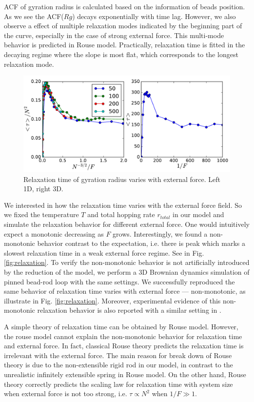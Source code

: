 \documentclass[aps,showpacs,twocolumn,floatfix,prx,superscriptaddress]{revtex4-1}
\begin{document}
ACF of gyration radius is calculated based on the information of beads position.
As we see the ACF($Rg$) decays exponentially with time
lag. However, we also observe a effect of multiple relaxation modes indicated
by the beginning part of the curve, especially in the case of strong external
force. This multi-mode behavior is predicted in Rouse model. 
Practically, relaxation time is fitted in the decaying regime where the slope
is most flat, which corresponds to the longest relaxation mode.   
\begin{figure}[htpb]
    \centering
    \includegraphics[width=1.0\linewidth]{tauscaling}
    \caption{Relaxation time of gyration radius varies with external force. Left
        1D, right 3D.}
    \label{fig:tauscaling}
\end{figure}
We interested in how the relaxation time varies with the external force field.
So we fixed the temperature $T$ and total hopping rate $r_{total}$ in our model and
simulate the relaxation behavior for different external force. One would
intuitively expect a monotonic decreasing as $F$ grows. Interestingly, we found a
non-monotonic behavior contrast to the expectation, i.e. there is peak which
marks a slowest relaxation time in a weak external force regime. See in Fig.
\ref{fig:relaxation}. To verify the non-monotonic behavior is not artificially
introduced by the reduction of the model, we perform a 3D Brownian dynamics
simulation of pinned bead-rod loop with the same settings. We successfully
reproduced the same behavior of relaxation time varies with external force ---
non-monotonic, as illustrate in Fig. \ref{fig:relaxation}. Moreover,
experimental evidence of this non-monotonic relaxation behavior is also
reported with a similar setting in \cite{Doyle2000}.

A simple theory of relaxation time can be obtained by Rouse
model\cite{Rouse1953,Doi1986}.
However, the rouse model cannot explain the non-monotonic behavior for
relaxation time and external force. In fact, classical Rouse theory predicts the
relaxation time is irrelevant with the external force. The main reason for break
down of Rouse theory is due to the non-extensible rigid rod in our model, in
contrast to the unrealistic infinitely extensible spring in Rouse model. On the
other hand, Rouse theory correctly predicts the scaling law for relaxation time
with system size when external force is not too strong, i.e. $\tau \propto N^2$
when $1/F \gg 1$.
\end{document}
